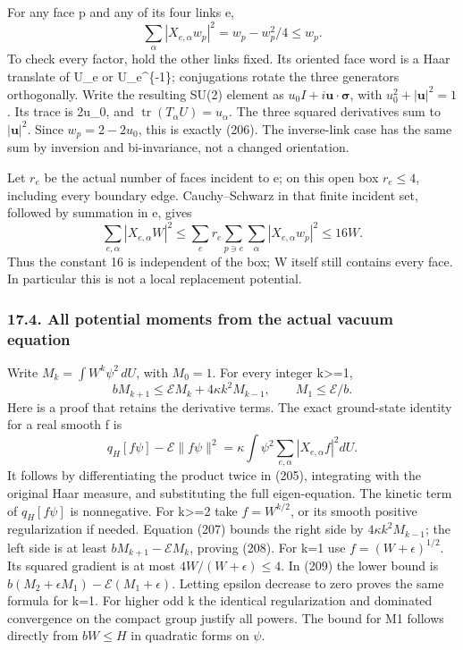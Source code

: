 \documentclass[
  11pt,
]{article}
\begin{document}
For any face p and any of its four links e, \[
 \sum_\alpha|X_{e,\alpha}w_p|^2=w_p-w_p^2/4\le w_p.       \tag{206}
\] To check every factor, hold the other links fixed. Its oriented face
word is a Haar translate of U\_e or U\_e\^{}\{-1\}; conjugations rotate
the three generators orthogonally. Write the resulting SU(2) element as
\(u_0I+i\boldsymbol u\cdot\boldsymbol\sigma\), with
\(u_0^2+|\boldsymbol u|^2=1\). Its trace is 2u\_0, and
\(\operatorname{tr}(T_\alpha U)=u_\alpha\). The three squared
derivatives sum to \(|\boldsymbol u|^2\). Since \(w_p=2-2u_0\), this is
exactly (206). The inverse-link case has the same sum by inversion and
bi-invariance, not a changed orientation.

Let \(r_e\) be the actual number of faces incident to e; on this open
box \(r_e\le4\), including every boundary edge. Cauchy--Schwarz in that
finite incident set, followed by summation in e, gives \[
 \sum_{e,\alpha}|X_{e,\alpha}W|^2
  \le\sum_e r_e\sum_{p\ni e}\sum_\alpha|X_{e,\alpha}w_p|^2
  \le16W.                                                   \tag{207}
\] Thus the constant 16 is independent of the box; W itself still
contains every face. In particular this is not a local replacement
potential.

\subsubsection{17.4. All potential moments from the actual vacuum
equation}\label{all-potential-moments-from-the-actual-vacuum-equation}

Write \(M_k=\int W^k\psi^2\,dU\), with \(M_0=1\). For every integer
k\textgreater=1, \[
 \boxed{bM_{k+1}\le\mathcal E M_k+4\kappa k^2M_{k-1},
 \qquad M_1\le\mathcal E/b.}                              \tag{208}
\] Here is a proof that retains the derivative terms. The exact
ground-state identity for a real smooth f is \[
 q_H[f\psi]-\mathcal E\|f\psi\|^2
   =\kappa\int\psi^2\sum_{e,\alpha}|X_{e,\alpha}f|^2dU.
                                                               \tag{209}
\] It follows by differentiating the product twice in (205), integrating
with the original Haar measure, and substituting the full
eigen-equation. The kinetic term of \(q_H[f\psi]\) is nonnegative. For
k\textgreater=2 take \(f=W^{k/2}\), or its smooth positive
regularization if needed. Equation (207) bounds the right side by
\(4\kappa k^2M_{k-1}\); the left side is at least
\(bM_{k+1}-\mathcal E M_k\), proving (208). For k=1 use
\(f=(W+\epsilon)^{1/2}\). Its squared gradient is at most
\(4W/(W+\epsilon)\le4\). In (209) the lower bound is
\(b(M_2+\epsilon M_1)-\mathcal E(M_1+\epsilon)\). Letting epsilon
decrease to zero proves the same formula for k=1. For higher odd k the
identical regularization and dominated convergence on the compact group
justify all powers. The bound for M1 follows directly from \(bW\le H\)
in quadratic forms on \(\psi\).
\end{document}
